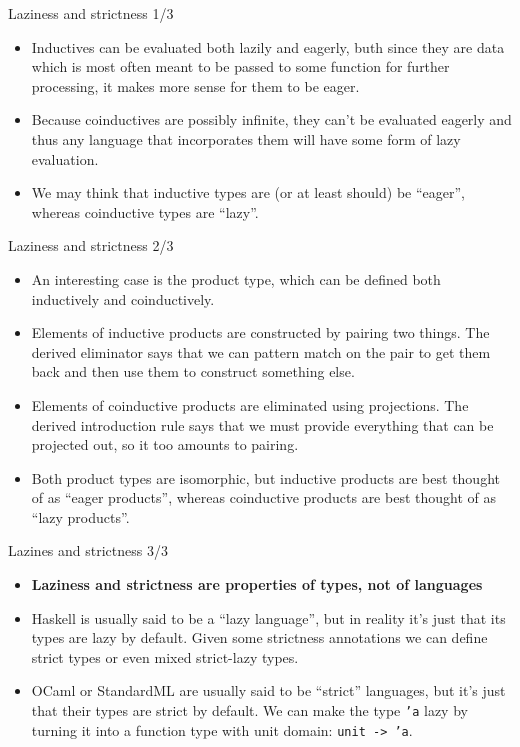 \documentclass{beamer}
\begin{document}
\begin{frame}{Laziness and strictness 1/3}
\begin{itemize}
	\item Inductives can be evaluated both lazily and eagerly, buth since they are data which is most often meant to be passed to some function for further processing, it makes more sense for them to be eager.
	\item Because coinductives are possibly infinite, they can't be evaluated eagerly and thus any language that incorporates them will have some form of lazy evaluation.
	\item We may think that inductive types are (or at least should) be ``eager'', whereas coinductive types are ``lazy''.
\end{itemize}
\end{frame}

\begin{frame}{Laziness and strictness 2/3}
\begin{itemize}
	\item An interesting case is the product type, which can be defined both inductively and coinductively.
	\item Elements of inductive products are constructed by pairing two things. The derived eliminator says that we can pattern match on the pair to get them back and then use them to construct something else.
	\item Elements of coinductive products are eliminated using projections. The derived introduction rule says that we must provide everything that can be projected out, so it too amounts to pairing.
	\item Both product types are isomorphic, but inductive products are best thought of as ``eager products'', whereas coinductive products are best thought of as ``lazy products''.
\end{itemize}
\end{frame}

\begin{frame}{Lazines and strictness 3/3}
\begin{itemize}
	\item \textbf{Laziness and strictness are properties of types, not of languages}
	\item Haskell is usually said to be a ``lazy language'', but in reality it's just that its types are lazy by default. Given some strictness annotations we can define strict types or even mixed strict-lazy types.
	\item OCaml or StandardML are usually said to be ``strict'' languages, but it's just that their types are strict by default. We can make the type \texttt{'a} lazy by turning it into a function type with unit domain: \texttt{unit -> 'a}.
\end{itemize}
\end{frame}
\end{document}
